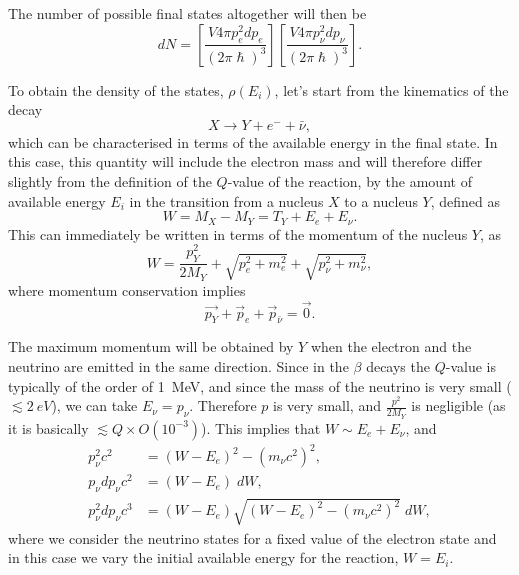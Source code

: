 The number of possible final states altogether will then be
\begin{equation}
    dN = \left[\frac{V4\pi p_e^2 dp_e}{(2\pi\hslash)^3} \right] \left[\frac{V4\pi p_{\nu}^2 dp_{\nu}}{(2\pi\hslash)^3} \right].
    \label{nuclear-physics-eq:1}
\end{equation}

To obtain the density of the states, $\rho(E_i)$, let's start from the kinematics of the decay
\begin{equation*}
    X \rightarrow Y+ e^- +\bar{\nu},
\end{equation*}
which can be characterised
in terms of the available energy in the final state.  In this case, this quantity will include the electron mass and will therefore differ slightly from the definition of the $Q$-value of the reaction, by the amount of available energy $E_i$ in the transition from a nucleus $X$ to a nucleus $Y$, defined as
\begin{equation*}
    W = M_X - M_Y = T_Y + E_e + E_\nu.
\end{equation*}
This can immediately be written in terms of the momentum of the nucleus $Y$, as
\begin{equation*}
    W = \frac{p^2_Y}{2M_Y} + \sqrt{p_e^2 + m_e^2} + \sqrt{p_\nu^2 + m_\nu^2},
\end{equation*}
where momentum conservation implies
\begin{equation*}
    \Vec{p_Y} + \Vec{p}_e + \Vec{p}_{\bar{\nu}} = \Vec{0}.
\end{equation*}

The maximum momentum will be obtained by $Y$ when the electron and the neutrino are emitted in the same direction. Since in the $\beta$ decays the $Q$-value is typically of the order of \SI{1}{MeV}, and since the mass of the neutrino is very small (\(\lesssim\SI{2}{eV}\)), we can take $E_\nu = p_\nu$. Therefore $p$ is very small, and $\frac{p^2}{2M_Y}$ is negligible (as it is basically \(\lesssim Q\times O(10^{-3})\)). This implies that $W \sim E_e + E_\nu$, and 
\begin{equation*}
    \begin{split}
        p_\nu^2c^2 & = (W-E_e)^2 - (m_\nu c^2)^2, \\
        p_\nu dp_{\nu} c^2 & = (W-E_e)\; dW, \\
        p_\nu^2 dp_{\nu} c^3 & = (W-E_e)\sqrt{(W-E_e)^2 - (m_{\nu} c^2)^2}\; dW,
    \end{split}
\end{equation*}
where we consider the neutrino states for a fixed value of the electron state and in this case we vary the initial available energy for the reaction, $W = E_i$.

